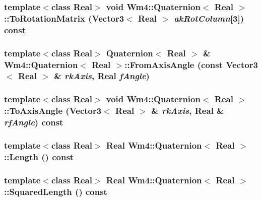 \subsubsection{\setlength{\rightskip}{0pt plus 5cm}template$<$class Real$>$ void {\bf Wm4::Quaternion}$<$ Real $>$::To\-Rotation\-Matrix ({\bf Vector3}$<$ Real $>$ {\em ak\-Rot\-Column}[3]) const}\label{classWm4_1_1Quaternion_6eb3b7589399327cf2719f5a29789220}


\subsubsection{\setlength{\rightskip}{0pt plus 5cm}template$<$class Real$>$ {\bf Quaternion}$<$ Real $>$ \& {\bf Wm4::Quaternion}$<$ Real $>$::From\-Axis\-Angle (const {\bf Vector3}$<$ Real $>$ \& {\em rk\-Axis}, Real {\em f\-Angle})}\label{classWm4_1_1Quaternion_d097d07210266da3e52292151367f340}


\subsubsection{\setlength{\rightskip}{0pt plus 5cm}template$<$class Real$>$ void {\bf Wm4::Quaternion}$<$ Real $>$::To\-Axis\-Angle ({\bf Vector3}$<$ Real $>$ \& {\em rk\-Axis}, Real \& {\em rf\-Angle}) const}\label{classWm4_1_1Quaternion_25d66b10903a1f0a0c2cdcfcccc012dd}


\subsubsection{\setlength{\rightskip}{0pt plus 5cm}template$<$class Real$>$ Real {\bf Wm4::Quaternion}$<$ Real $>$::Length () const\hspace{0.3cm}{\tt  [inline]}}\label{classWm4_1_1Quaternion_f805700ec8fc3cee1c8daff3ecdfe88c}


\subsubsection{\setlength{\rightskip}{0pt plus 5cm}template$<$class Real$>$ Real {\bf Wm4::Quaternion}$<$ Real $>$::Squared\-Length () const\hspace{0.3cm}{\tt  [inline]}}\label{classWm4_1_1Quaternion_29e4ef607e51b0c034cdf0568c30f7cb}


